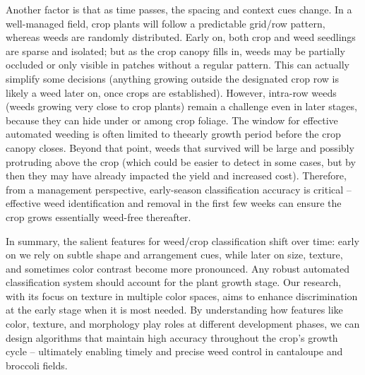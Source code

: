 \documentclass[letterpaper]{report}
\begin{document}
Another factor is that as time passes, the spacing and context cues change. In a well-managed field, crop plants will follow a predictable grid/row pattern, whereas weeds are randomly distributed. Early on, both crop and weed seedlings are sparse and isolated; but as the crop canopy fills in, weeds may be partially occluded or only visible in patches without a regular pattern. This can actually simplify some decisions (anything growing outside the designated crop row is likely a weed later on, once crops are established). However, intra-row weeds (weeds growing very close to crop plants) remain a challenge even in later stages, because they can hide under or among crop foliage. The window for effective automated weeding is often limited to theearly growth period before the crop canopy closes. Beyond that point, weeds that survived will be large and possibly protruding above the crop (which could be easier to detect in some cases, but by then they may have already impacted the yield and increased cost). Therefore, from a management perspective, early-season classification accuracy is critical – effective weed identification and removal in the first few weeks can ensure the crop grows essentially weed-free thereafter.

In summary, the salient features for weed/crop classification shift over time: early on we rely on subtle shape and arrangement cues, while later on size, texture, and sometimes color contrast become more pronounced. Any robust automated classification system should account for the plant growth stage. Our research, with its focus on texture in multiple color spaces, aims to enhance discrimination at the early stage when it is most needed. By understanding how features like color, texture, and morphology play roles at different development phases, we can design algorithms that maintain high accuracy throughout the crop’s growth cycle – ultimately enabling timely and precise weed control in cantaloupe and broccoli fields. 
\end{document}

